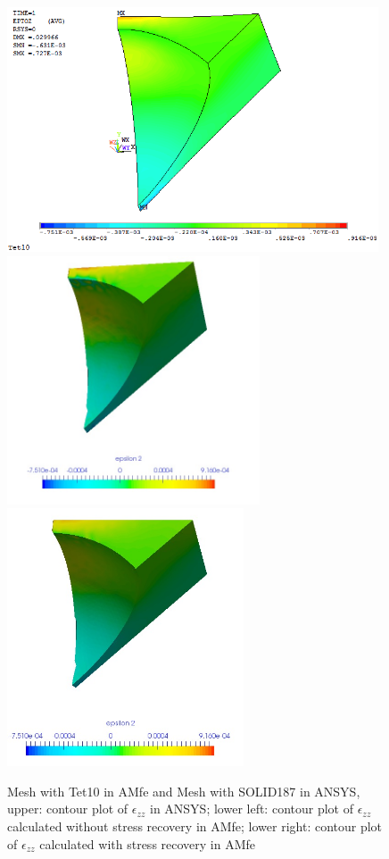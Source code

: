 \begin{figure}[htbp]
	\begin{center}
		\includegraphics[width=11cm,clip]{Tet10_Ezz.png} 
		\includegraphics[width=7.5cm,clip]{Tet10_Ezz_PD.png} 		
		\includegraphics[width=7cm,clip]{Tet10_Ezz_P.png} 		
		\caption{Mesh with Tet10 in AMfe and Mesh with SOLID187 in ANSYS, upper: contour plot of $\epsilon_{zz}$ in ANSYS; lower left: contour plot of $\epsilon_{zz}$ calculated without stress recovery in AMfe; lower right: contour plot of $\epsilon_{zz}$ calculated with stress recovery in AMfe} \label{fig: Tet10_Ezz}
	\end{center}
\end{figure}
\clearpage 

